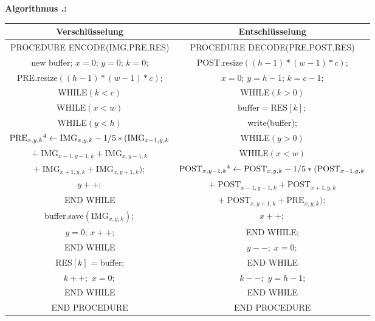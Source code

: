 \documentclass[a4paper,12pt]{article}
\newcounter{Algorithmus}
\newenvironment{Algorithmus}{
\medskip
        
        \setlength{\parindent}{0pt}
        \addtocounter{Algorithmus}{1}
        \textbf{\textsf{Algorithmus \thesubsection.\theAlgorithmus}:}}{
        \nopagebreak
        \vspace{-1.0ex}
        \bigskip
        
}
\begin{document}
\begin{Algorithmus}
\\
\begin{tabular}{c|c}
Verschlüsselung & Entschlüsselung
\\
\hline
PROCEDURE ENCODE(IMG,PRE,RES) & PROCEDURE DECODE(PRE,POST,RES)
\\
new buffer; $x=0$; $y=0$; $k=0$; & POST.resize$((h-1)*(w-1)*c)$;
\\
PRE.resize$((h-1)*(w-1)*c)$; & $x=0$; $y=h-1$; $k=c-1$;
\\
WHILE$(k < c)$ &                  WHILE$(k > 0)$
\\
WHILE$(x < w)$ &               $\text{buffer} = \text{RES}[k];$
\\
WHILE$(y < h)$ &            write(buffer);
\\
$\text{PRE}_{x,y,k}\footnotemark[4]\leftarrow \text{IMG}_{x,y,k} - 1/5 *(\text{IMG}_{x-1,y,k}$ & WHILE$(y > 0)$ 
\\
$+\;\text{IMG}_{x-1,y-1,k} + \text{IMG}_{x,y-1,k}$  &  WHILE$(x<w)$
\\
$+\;\text{IMG}_{x+1,y,k} + \text{IMG}_{x,y+1,k});$ & $\text{POST}_{x,y-1,k}\footnotemark[4]\leftarrow \text{POST}_{x,y,k} - 1/5 *(\text{POST}_{x-1,y,k} $ 
\\
$y++;$ &   $+\;\text{POST}_{x-1,y-1,k} + \text{POST}_{x+1,y,k}$  
\\
END WHILE  & $+\;\text{POST}_{x,y+1,k} + \text{PRE}_{x,y,k});$
\\
buffer.save$(\text{IMG}_{x,y,k});$  & $x++;$
\\
$y=0$; $x++$;  &   END WHILE; 
\\
END WHILE   & $y--;\;x=0;$ 
\\
RES$[k]$ = buffer;  &  END WHILE 
\\
$k++;$ $x=0;$   &   $k--;$ $y=h-1$;
\\
END WHILE & END WHILE 
\\
END PROCEDURE & END PROCEDURE
\end{tabular}
\end{Algorithmus}
\end{document}
